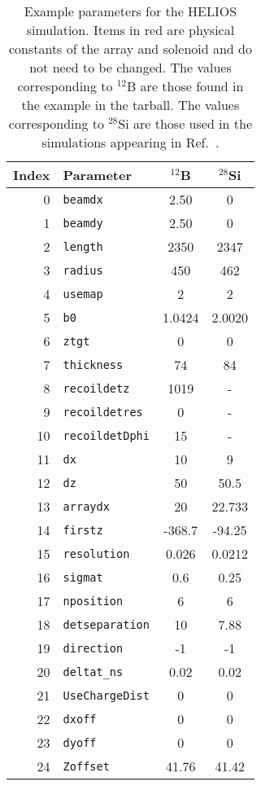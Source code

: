 \begin{table}[hb]%
\label{sim_params}
\centering
\begin{tabular}{rl|c|c}
	 Index&Parameter&$^{12}$B&$^{28}$Si\\\hline%
	 0&\texttt{beamdx}&2.50&0\\
	 1&\texttt{beamdy}&2.50&0\\
	 2&\texttt{length}&2350&{\color{red}2347}\\
	 3&\texttt{radius}&450&{\color{red}462}\\
	 4&\texttt{usemap}&2&2\\
	 5&\texttt{b0}&1.0424&2.0020\\
	 6&\texttt{ztgt}&0&0\\
	 7&\texttt{thickness}&74&84\\
	 8&\texttt{recoildetz}&{\color{red}1019}&-\\
	 9&\texttt{recoildetres}&0&-\\
	10&\texttt{recoildetDphi}&15&-\\
	11&\texttt{dx}&10&{\color{red}9}\\
	12&\texttt{dz}&50&{\color{red}50.5}\\
	13&\texttt{arraydx}&20&{\color{red}22.733}\\
	14&\texttt{firstz}&-368.7&-94.25\\
	15&\texttt{resolution}&0.026&0.0212\\
	16&\texttt{sigmat}&0.6&0.25\\
	17&\texttt{nposition}&{\color{red}6}&6\\
	18&\texttt{detseparation}&10&7.88\\
	19&\texttt{direction}&-1&-1\\
	20&\texttt{deltat\_ns}&0.02&0.02\\
	21&\texttt{UseChargeDist}&0&0\\
	22&\texttt{dxoff}&0&0\\
	23&\texttt{dyoff}&0&0\\
	24&\texttt{Zoffset}&41.76&{\color{red}41.42}\\
\end{tabular}
\caption[Example parameters for the HELIOS simulation.]{Example parameters for the HELIOS simulation.  Items in {\color{red}red} are physical constants of the array and solenoid and do not need to be changed.  The values corresponding to $^{12}$B are those found in the example in the tarball.  The values corresponding to $^{28}$Si are those used in the simulations appearing in Ref.~\cite{Lighthall_2010}.}
\end{table}